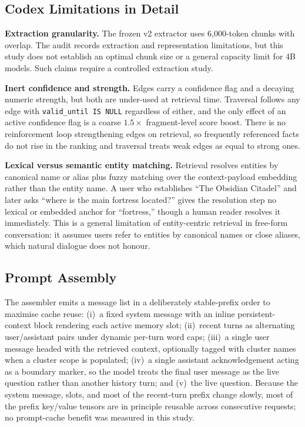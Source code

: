 \documentclass[twoside,11pt]{article}
\begin{document}
\subsection{Codex Limitations in Detail}
\label{app:codex-limits}

\textbf{Extraction granularity.} The frozen v2 extractor uses 6,000-token chunks with overlap. The audit records extraction and representation limitations, but this study does not establish an optimal chunk size or a general capacity limit for 4B models. Such claims require a controlled extraction study.

\textbf{Inert confidence and strength.} Edges carry a confidence flag and a decaying numeric strength, but both are under-used at retrieval time. Traversal follows any edge with \texttt{valid\_until IS NULL} regardless of either, and the only effect of an active confidence flag is a coarse $1.5\times$ fragment-level score boost. There is no reinforcement loop strengthening edges on retrieval, so frequently referenced facts do not rise in the ranking and traversal treats weak edges as equal to strong ones.

\textbf{Lexical versus semantic entity matching.} Retrieval resolves entities by canonical name or alias plus fuzzy matching over the context-payload embedding rather than the entity name. A user who establishes ``The Obsidian Citadel'' and later asks ``where is the main fortress located?'' gives the resolution step no lexical or embedded anchor for ``fortress,'' though a human reader resolves it immediately. This is a general limitation of entity-centric retrieval in free-form conversation: it assumes users refer to entities by canonical names or close aliases, which natural dialogue does not honour.

\subsection{Prompt Assembly}
\label{app:assembly}

The assembler emits a message list in a deliberately stable-prefix order to maximise cache reuse: (i)~a fixed system message with an inline persistent-context block rendering each active memory slot; (ii)~recent turns as alternating user/assistant pairs under dynamic per-turn word caps; (iii)~a single user message headed with the retrieved context, optionally tagged with cluster names when a cluster scope is populated; (iv)~a single assistant acknowledgement acting as a boundary marker, so the model treats the final user message as the live question rather than another history turn; and (v)~the live question. Because the system message, slots, and most of the recent-turn prefix change slowly, most of the prefix key/value tensors are in principle reusable across consecutive requests; no prompt-cache benefit was measured in this study.
\end{document}
